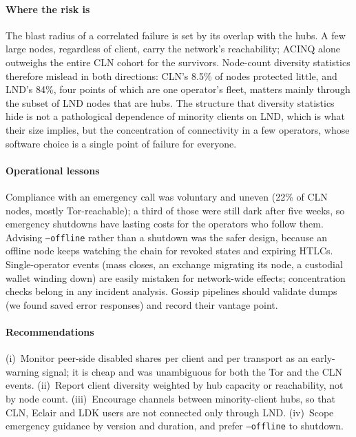 \documentclass[conference]{IEEEtran}
\begin{document}
\paragraph*{Where the risk is}
The blast radius of a correlated failure is set by its overlap with the hubs. A few large nodes, regardless of
client, carry the network's reachability; ACINQ alone outweighs the entire CLN cohort for the survivors. Node-count
diversity statistics therefore mislead in both directions: CLN's 8.5\% of nodes protected little, and LND's 84\%,
four points of which are one operator's fleet, matters mainly through the subset of LND nodes that are hubs. The structure that diversity statistics hide is not a
pathological dependence of minority clients on LND, which is what their size implies, but the concentration of
connectivity in a few operators, whose software choice is a single point of failure for everyone.

\paragraph*{Operational lessons}
Compliance with an emergency call was voluntary and uneven (22\% of CLN nodes, mostly Tor-reachable); a third of
those were still dark after five weeks, so emergency shutdowns have lasting costs for the operators who follow them.
Advising \texttt{--offline} rather than a shutdown was the safer design, because an offline node keeps watching the
chain for revoked states and expiring HTLCs. Single-operator events (mass closes, an exchange migrating its node, a
custodial wallet winding down) are easily mistaken for network-wide effects; concentration checks belong in any
incident analysis. Gossip pipelines should validate dumps (we found saved error responses) and record their vantage
point.

\paragraph*{Recommendations}
(i)~Monitor peer-side disabled shares per client and per transport as an early-warning signal; it is cheap and
was unambiguous for both the Tor and the CLN events. (ii)~Report client diversity weighted by hub capacity or
reachability, not by node count. (iii)~Encourage channels between minority-client hubs, so that CLN, Eclair and LDK
users are not connected only through LND. (iv)~Scope emergency guidance by version and duration, and prefer
\texttt{--offline} to shutdown.

\end{document}
